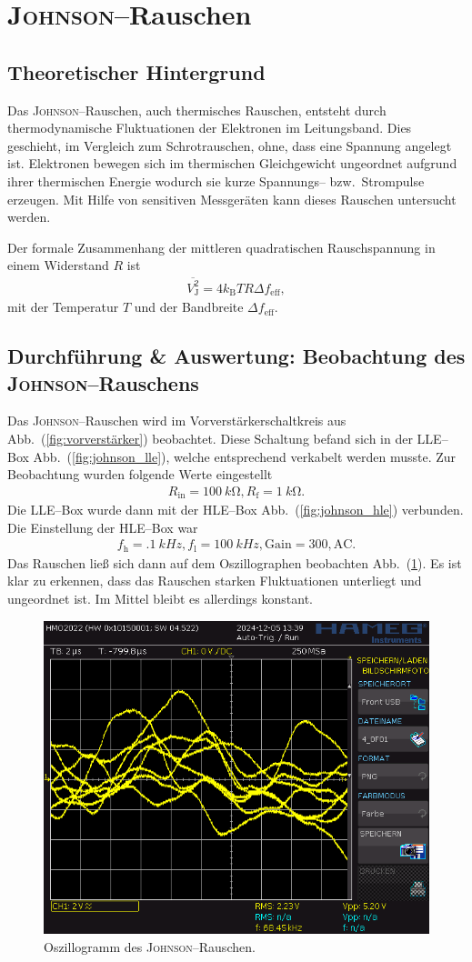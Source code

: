 \documentclass[sn-mathphys-num,iicol]{sn-jnl}
\theoremstyle{thmstyleone}
\theoremstyle{thmstyletwo}
\theoremstyle{thmstylethree}
\begin{document}
\section{\textsc{Johnson}--Rauschen}
\subsection{Theoretischer Hintergrund}
Das \textsc{Johnson}--Rauschen, auch thermisches Rauschen, entsteht durch thermodynamische Fluktuationen der Elektronen im Leitungsband.
Dies geschieht, im Vergleich zum Schrotrauschen, ohne, dass eine Spannung angelegt ist.
Elektronen bewegen sich im thermischen Gleichgewicht ungeordnet aufgrund ihrer thermischen Energie wodurch sie kurze Spannungs-- bzw.\ Strompulse erzeugen.
Mit Hilfe von sensitiven Messgeräten kann dieses Rauschen untersucht werden.

Der formale Zusammenhang der mittleren quadratischen Rauschspannung in einem Widerstand $R$ ist
\begin{align}
	\overline{V^2_\text{J}}=4k_\text{B}TR\Delta f_\text{eff}
	,\end{align}
mit der Temperatur $T$ und der Bandbreite $\Delta f_\text{eff}$.

\subsection{Durchführung \& Auswertung: Beobachtung des \textsc{Johnson}--Rauschens}
Das \textsc{Johnson}--Rauschen wird im Vorverstärkerschaltkreis aus Abb.\ (\ref{fig:vorverstärker}) beobachtet.
Diese Schaltung befand sich in der LLE--Box Abb.\ (\ref{fig:johnson_lle}), welche entsprechend verkabelt werden musste.
Zur Beobachtung wurden folgende Werte eingestellt
\begin{align}
	R_\text{in}=\SI{100}{k\ohm},R_\text{f}=\SI{1}{k\ohm}
	.\end{align}
Die LLE--Box wurde dann mit der HLE--Box Abb.\ (\ref{fig:johnson_hle}) verbunden.
Die Einstellung der HLE--Box war
\begin{align}
	f_\text{h}=\SI{.1}{kHz},f_\text{l}=\SI{100}{kHz},\text{Gain}=300,\text{AC}
	.\end{align}
Das Rauschen ließ sich dann auf dem Oszillographen beobachten Abb.\ (\ref{fig:johnson_oszi}).
Es ist klar zu erkennen, dass das Rauschen starken Fluktuationen unterliegt und ungeordnet ist.
Im Mittel bleibt es allerdings konstant.

\begin{figure}[t]
	\centering
	\includegraphics[width=.5\textwidth]{../data/4_0F01.png}
	\caption{Oszillogramm des \textsc{Johnson}--Rauschen.} \label{fig:johnson_oszi}
\end{figure}
\end{document}
